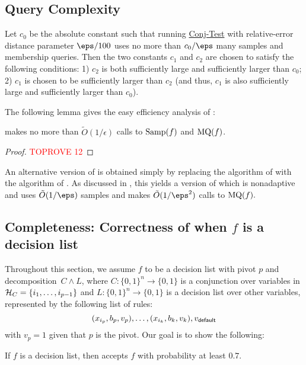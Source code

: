 \documentclass[11pt]{article}
\theoremstyle{definition}
\begin{document}
\subsection{Query Complexity}\label{sec:queryandnonadaptivity}

Let $c_0$ be the absolute constant such that running 
  \hyperlink{Algorithm2}{\sc Conj-Test} with relative-error distance
  parameter $\eps/100$ uses no more than $c_0/\eps$ many
  samples and membership queries.
Then the two constants $c_1$ and $c_2$ are chosen to satisfy the 
  following conditions:
 1) $c_2$ is both sufficiently large and sufficiently larger
  than $c_0$;
 2) $c_1$ is chosen to be sufficiently larger than $c_2$ (and thus, $c_1$ is also sufficiently large and sufficiently larger than $c_0$).

The following lemma gives the easy efficiency analysis of :
\begin{lemma}
      makes no more than $\tilde{O}(1/\epsilon)$ calls to $\mathrm{Samp}(f)$ and $\mathrm{MQ}(f)$.
\end{lemma}
\begin{proof}\textcolor{red}{TOPROVE 12}\end{proof}














\begin{remark} \label{remark:DL-nonadaptive}
An alternative version of  is obtained simply by replacing the algorithm of 
with the algorithm of .  As discussed in , this yields a version of  which is nonadaptive and uses $\tilde{O}(1/\eps)$ samples and makes $\tilde{O}(1/\eps^2)$ calls to $\mathrm{MQ}(f).$
\end{remark}


\subsection{Completeness: 
 Correctness of  when $f$ is a decision list}
 \label{sec:completeness}

Throughout this section, we assume $f$ to be a decision list with 
  pivot $p$ and decomposition~$C\land L$,
  where
$C:\{0,1\}^n\rightarrow \{0,1\}$ is a conjunction over variables in ${\cal H}_C=\{i_1,\ldots,i_{p-1}\}$ and 
$L:\{0,1\}^n\rightarrow \{0,1\}$ is a decision list over other variables,
  represented by the following list of rules: $$(x_{i_p}, b_{p},v_p), \ldots, (x_{i_k}, b_k, v_k), v_{\mathsf{default}}$$
with $v_p=1$ given that $p$ is the pivot.
  Our goal is to show the following:
\begin{theorem}\label{thm: when f is a DL}
If $f$ is a decision list, then  accepts $f$ with probability at least $0.7$.
\end{theorem}
\end{document}

